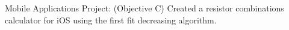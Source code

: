 \begin{cventries}
{\begin{cvitems}
          \item{Mobile Applications Project: (Objective C) Created a resistor combinations calculator for iOS using the first fit decreasing algorithm.}
      \end{cvitems}
    }


\end{cventries}
